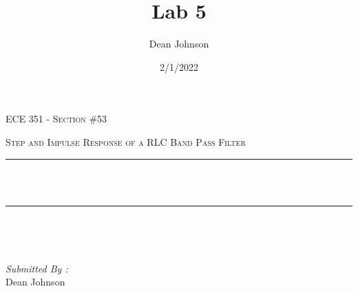 \documentclass[12pt]{report}
\title{Lab 5}
\author{ Dean Johnson}
\date{2/1/2022}
\makeatletter
\let\thetitle\@title
\makeatother
\begin{document}

\begin{titlepage}
	\centering
    \vspace*{0.5 cm}
\begin{center}    \textsc{\Large   ECE 351 - Section \#53 }\\[2.0 cm]	\end{center}%
	\textsc{\Large Step and Impulse Response of a RLC Band Pass Filter }\\[0.5 cm]				%
	\rule{\linewidth}{0.2 mm} \\[0.4 cm]
	{ \huge \bfseries \thetitle}\\
	\rule{\linewidth}{0.2 mm} \\[1.5 cm]
	
	\begin{minipage}{0.4\textwidth}
		\begin{flushleft} \large
			\end{flushleft}
			\end{minipage}~
			\begin{minipage}{0.4\textwidth}
            
			\begin{flushright} \large
			\emph{Submitted By :} \\
			Dean Johnson  
		\end{flushright}
           
	\end{minipage}\\[2 cm]
	
    
    
    
    
	
\end{titlepage}


\tableofcontents
\pagebreak

\renewcommand{\thesection}{\arabic{section}}
\end{document}
